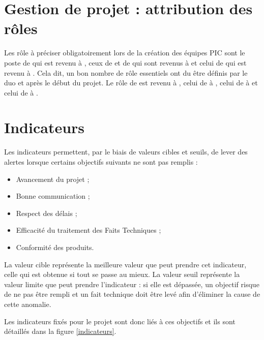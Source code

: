 \documentclass[asi]{picInsa}
\begin{document}
\section{Gestion de projet : attribution des rôles}
Les rôle à préciser obligatoirement lors de la création des équipes PIC sont le poste de \CP{} qui est revenu à \Sergi{}, ceux de \CPA{} et de \RQ{} qui sont revenus à \Pierre{} et celui de \RQA{} qui est revenu à \Kafui{}. Cela dit, un bon nombre de rôle essentiels ont du être définis par le duo \CP{} et \RQ{} après le début du projet. Le rôle de \RGC{} est revenu à \Mathieu{}, celui de \RD{} à \Michel, celui de \RRS{} à \Matthieu{} et celui de \RS{} à \Florian{}.

\section{Indicateurs}
Les indicateurs permettent, par le biais de valeurs cibles et seuils, de lever des alertes lorsque certains objectifs suivants ne sont pas remplis :
\begin{itemize}
\item Avancement du projet ;
\item Bonne communication ;
\item Respect des délais ;
\item Efficacité du traitement des Faits Techniques ;
\item Conformité des produits.
\end{itemize}
La valeur cible représente la meilleure valeur que peut prendre cet indicateur, celle qui est obtenue si tout se passe au mieux. La valeur seuil représente la valeur limite que peut prendre l’indicateur : si elle est dépassée, un objectif risque de ne pas être rempli et un fait technique doit être levé afin d’éliminer la cause de cette anomalie.

Les indicateurs fixés pour le projet \nomEquipe{} sont donc liés à ces objectifs et ils sont détaillés dans la figure \ref{indicateurs}.
\end{document}
